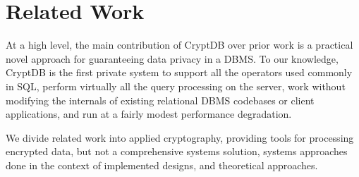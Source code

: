\section{Related Work}
\label{s:related}

At a high level, the main contribution of CryptDB over prior work is a
practical novel approach for guaranteeing data privacy in a DBMS\@.
To our knowledge, CryptDB is the first private system to support all the
operators used commonly in SQL, perform virtually all the query processing on
the server, work without modifying the internals of existing
relational DBMS codebases or client applications, and run at a fairly modest
performance degradation.

We divide related work into applied cryptography,  providing tools for
processing encrypted data, but not a comprehensive systems solution, systems
approaches done in the context of implemented designs, and theoretical
approaches.



\vspace{-0.2cm}
